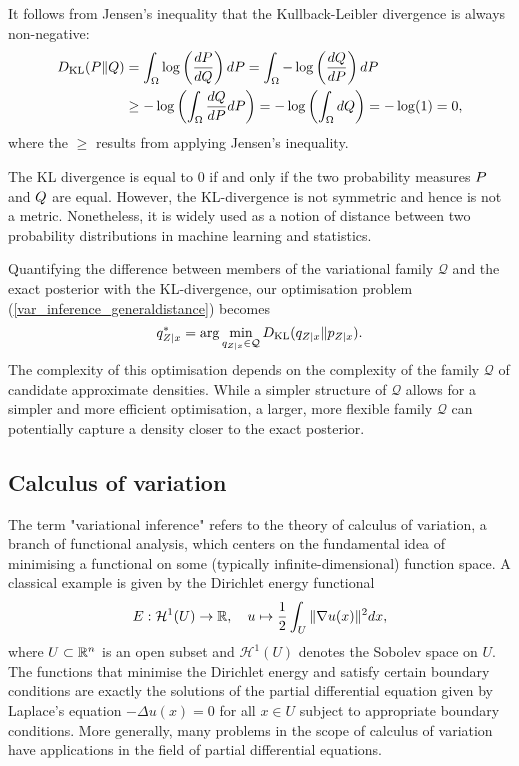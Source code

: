 \begin{rmk}\label{rmk:kl-div-nonnegative}
	It follows from Jensen's inequality that the Kullback-Leibler divergence is always non-negative:
	\begin{equation*}
	\begin{split}
		\dkl(\P\Vert \Q)  &= \int_{\Omega} \log\left(\frac{d\P}{d\Q}\right) d\P = \int_{\Omega} -\log\left(\frac{d\Q}{d\P}\right) d\P \\
		& \geq -\log \left(\int_{\Omega} \frac{d\Q}{d\P} d\P\right) = -\log \left(\int_{\Omega} d\Q\right) = -\log(1) = 0,
	\end{split}
	\end{equation*}
	where the $\geq$ results from applying Jensen's inequality. 
	
	The KL divergence is equal to $0$ if and only if the two probability measures $\P$ and $\Q$ are equal.
	However, the KL-divergence is not symmetric and hence is not a metric.
	Nonetheless, it is widely used as a notion of distance between two probability distributions in machine learning and statistics. 
\end{rmk}

Quantifying the difference between members of the variational family $\mathcal{Q}$ and the exact posterior with the KL-divergence, our optimisation problem (\ref{var_inference_generaldistance}) becomes
\begin{equation}\label{var_inference_withkl}
	q^*_{Z\mid x} = \arg \min_{q_{Z\mid x}\in\mathcal{Q}} \dkl(q_{Z\mid x}\Vert p_{Z\mid x}).
\end{equation}
The complexity of this optimisation depends on the complexity of the family $\mathcal{Q}$ of candidate approximate densities. While a simpler structure of $\mathcal{Q}$ allows for a simpler and more efficient optimisation, a larger, more flexible family $\mathcal{Q}$ can potentially capture a density closer to the exact posterior. 

\subsection{Calculus of variation}\label{sec:calculus_of_variation}
The term "variational inference" refers to the theory of calculus of variation, a branch of functional analysis, which centers on the fundamental idea of minimising a functional on some (typically infinite-dimensional) function space. A classical example is given by the Dirichlet energy functional
$$
	E: \mathcal{H}^1(U) \to \R, \quad u\mapsto \frac{1}{2}\int_U \Vert \nabla u(x)\Vert^2 dx,
$$
where $U\subset \R^n$ is an open subset and $\mathcal{H}^1(U)$ denotes the Sobolev space on $U$. The functions that minimise the Dirichlet energy and satisfy certain boundary conditions are exactly the solutions of the partial differential equation given by Laplace's equation $-\Delta u(x) = 0$ for all $x\in U$ subject to appropriate boundary conditions.  More generally, many problems in the scope of calculus of variation have applications in the field of partial differential equations. 

